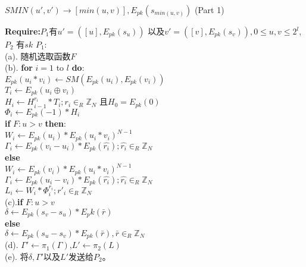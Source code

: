 \begin{algorithm}[htbp]
\small
\caption{$SMIN(u',v')\rightarrow [min(u,v)],E_{pk}(s_{min(u,v)})$ (Part 1)}
\label{alg:algorithm1}
\begin{algorithmic}[1]
    \State \textbf{Require:}$P_1$有$u'=([u],E_{pk}(s_u))$ 以及$v'=([v],E_{pk}(s_v)), 0 \leq u,v \leq2^l$,$P_2$ 有$sk$
    \State $P_1:$\\
    (a).\hspace{0.1cm} 随机选取函数$F$\\
    (b).\hspace{0.1cm} \textbf{for} $i=1$ to $l$ \textbf{do}:\\
    \hspace{1cm} $E_{pk}(u_i*v_i) \leftarrow SM(E_{pk}(u_i),E_{pk}(v_i))$\\
    \hspace{1cm} $T_i \leftarrow E_{pk}(u_i\oplus v_i)$\\
    \hspace{1cm} $H_i \leftarrow H^{r_i}_{i-1}*T_i;r_i \in_R \mathbb{Z}_N$ 且$H_0=E_{pk}(0)$\\
    \hspace{1cm} $\Phi_i \leftarrow E_{pk}(-1)*H_i$\\
    \hspace{1cm} \textbf{if} $F: u > v$ \textbf{then}:\\
    \hspace{1.5cm} $W_i \leftarrow E_{pk}(u_i)*E_{pk}(u_i*v_i)^{N-1}$\\
    \hspace{1.5cm} $\Gamma_i \leftarrow E_{pk}(v_i-u_i)*E_{pk}(\hat{r_i});\hat{r_i} \in_R \mathbb{Z}_N$\\
    \hspace{1cm} \textbf{else}\\
    \hspace{1.5cm} $W_i \leftarrow E_{pk}(v_i)*E_{pk}(u_i*v_i)^{N-1}$\\
    \hspace{1.5cm} $\Gamma_i \leftarrow E_{pk}(u_i-v_i)*E_{pk}(\hat{r_i});\hat{r_i}\in_R\mathbb{Z}_N$\\
    \hspace{0.9cm}$L_i \leftarrow W_i*\Phi^{r_i}_i;r'_i \in_R \mathbb{Z}_N$\\
    (c).\hspace{0.1cm}\textbf{if} $F:u>v$\\
     \hspace{1cm}$\delta \leftarrow E_{pk}(s_v-s_u)*E_pk(\bar{r})$\\
     \hspace{0.6cm}\textbf{else}\\
     \hspace{1cm} $\delta \leftarrow E_{pk}(s_u-s_v)*E_{pk}(\bar{r}),\bar{r} \in_R \mathbb{Z}_N$\\
     (d).\hspace{0.1cm} $\Gamma'\leftarrow \pi_1(\Gamma)$,$L'\leftarrow \pi_2(L)$\\
     (e).\hspace{0.1cm} 将$\delta,\Gamma'$以及$L'$发送给$P_2$。
\end{algorithmic}
\end{algorithm}


